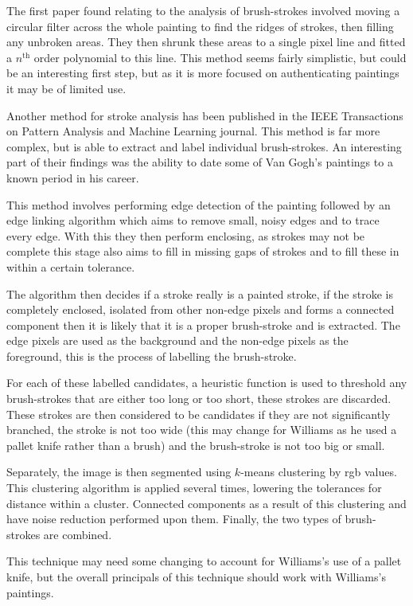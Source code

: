 The first paper found relating to the analysis of brush-strokes involved moving a circular filter
across the whole painting to find the ridges of strokes, then filling any unbroken areas. They then
shrunk these areas to a single pixel line and fitted a $n^{\text{th}}$ order polynomial to this
line\cite{Berezhnoy2005Authentic}. This method seems fairly simplistic, but could be an interesting
first step, but as it is more focused on authenticating paintings it may be of limited use.

Another method for stroke analysis has been published in the IEEE Transactions on Pattern Analysis
and Machine Learning journal. This method is far more complex, but is able to extract and label
individual brush-strokes. An interesting part of their findings was the ability to date some of Van
Gogh's paintings to a known period in his career\cite{Li2012Rhythmic}.

This method involves performing edge detection of the painting followed by an edge linking 
algorithm which aims to remove small, noisy edges and to trace every edge. With this they then
perform enclosing, as strokes may not be complete this stage also aims to fill in missing gaps of
strokes and to fill these in within a certain tolerance.

The algorithm then decides if a stroke really is a painted stroke, if the stroke is completely 
enclosed, isolated from other non-edge pixels and forms a connected component then it is likely 
that it is a proper brush-stroke and is extracted. The edge pixels are used as the background and
the non-edge pixels as the foreground, this is the process of labelling the brush-stroke.

For each of these labelled candidates, a heuristic function is used to threshold any brush-strokes 
that are either too long or too short, these strokes are discarded. These strokes are then
considered to be candidates if they are not significantly branched, the stroke is not too wide 
(this may change for Williams as he used a pallet knife rather than a brush) and the 
brush-stroke is not too big or small.

Separately, the image is then segmented using $k$-means clustering by \gls{rgb} values. This clustering 
algorithm is applied several times, lowering the tolerances for distance within a cluster. 
Connected components as a result of this clustering and have noise reduction performed upon them.
Finally, the two types of brush-strokes are combined.

This technique may need some changing to account for Williams's use of a pallet knife, but
the overall principals of this technique should work with Williams's paintings.


